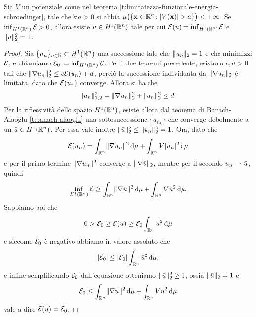 \begin{teorema} \label{t:esistenza-soluzione-debole-schroedinger}
    Sia $V$ un potenziale come nel teorema \ref{t:limitatezza-funzionale-energia-schroedinger}, tale che $\forall a>0$ si abbia $\mu\bigl(\{\vec x\in\R^n\colon\abs{V(\vec x)}>a\}\bigr)<+\infty$.
    Se $\inf_{\sobH[1]{\R^n}}\E>0$, allora esiste $\bar{u}\in\sobH[1]{\R^n}$ tale per cui $\E(\bar{u})=\inf_{\sobH[1]{\R^n}}\E$ e $\norm{\bar{u}}_2^2=1$.
\end{teorema}
\begin{proof}
    Sia $\{u_n\}_{n\in\N}\subset\sobH[1]{\R^n}$ una successione tale che $\norm{u_n}_2=1$ e che minimizzi $\E$, e chiamiamo $\E_0\defeq\inf_{\sobH[1]{\R^n}}\E$.
    Per i due teoremi precedente, esistono $c,d>0$ tali che $\norm{\grad u_n}_2^2\le c\E(u_n)+d$, perciò la successione individuata da $\norm{\grad u_n}_2$ è limitata, dato che $\E(u_n)$ converge.
    Allora si ha che
    \begin{equation}
        \norm{u_n}_{1,2}^2=\norm{\grad u_n}_2^2+\norm{u_n}_2^2\le d.
    \end{equation}
    Per la riflessività dello spazio $\sobH[1]{\R^n}$, esiste allora dal teorema di Banach-Alao\u{g}lu \ref{t:banach-alaoglu} una sottosuccessione $\{u_{n_k}\}$ che converge debolmente a un $\bar{u}\in\sobH[1]{\R^n}$.
    Per essa vale inoltre $\norm{\bar{u}}_2^2\le\norm{u_n}_2^2=1$.
    Ora, dato che
    \begin{equation}
        \E(u_n)=
        \int_{\R^n}\norm{\grad u_n}^2\,\dd\mu+\int_{\R^n}V\abs{u_n}^2\,\dd\mu
    \end{equation}
    e per il primo termine $\norm{\grad u_n}^2$ converge a $\norm{\grad\bar{u}}_2$, mentre per il secondo $u_n\weakto\bar{u}$, quindi
    \begin{equation}
        \inf_{\sobH[1]{\R^n}}\E\ge
        \int_{\R^n}\norm{\grad\bar{u}}^2\,\dd\mu+\int_{\R^n}V\bar{u}^2\,\dd\mu.
    \end{equation}
    Sappiamo poi che
    \begin{equation}
        0>
        \E_0\ge
        \E(\bar{u})\ge
        \E_0\int_{\R^n}\bar{u}^2\,\dd\mu
    \end{equation}
    e siccome $\E_0$ è negativo abbiamo in valore assoluto che
    \begin{equation}
        \abs{\E_0}\le
        \abs{\E_0}\int_{\R^n}\bar{u}^2\,\dd\mu,
    \end{equation}
    e infine semplificando $\E_0$ dall'equazione otteniamo $\norm{\bar{u}}_2^2\ge 1$, ossia $\norm{\bar{u}}_2=1$ e
    \begin{equation}
        \E_0\le
        \int_{\R^n}\norm{\grad\bar{u}}^2\,\dd\mu+\int_{\R^n}V\bar{u}^2\,\dd\mu
    \end{equation}
    vale a dire $\E(\bar{u})=\E_0$.
\end{proof}

